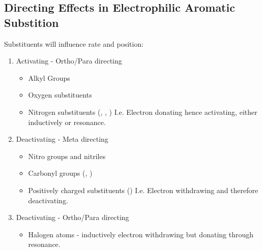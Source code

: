 \subsection{Directing Effects in Electrophilic Aromatic Substition}

Substituents will influence rate and position:

\begin{enumerate}[label=\alph*)]

  \item Activating - Ortho/Para directing
    \begin{itemize}
      \item Alkyl Groups
      \item Oxygen substituents
      \item Nitrogen substituents (, , )
        I.e. Electron donating hence activating, either inductively or resonance.
    \end{itemize}

  \item Deactivating - Meta directing
    \begin{itemize}
      \item Nitro groups and nitriles
      \item Carbonyl groups (, )
      \item Positively charged substituents ()
        I.e. Electron withdrawing and therefore deactivating.
    \end{itemize}

  \item Deactivating - Ortho/Para directing
    \begin{itemize}
      \item Halogen atoms - inductively electron withdrawing but donating through resonance.
    \end{itemize}
\end{enumerate}
